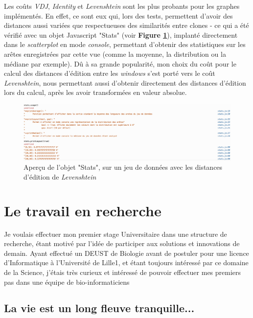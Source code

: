 \documentclass[pdftex,12pt,a4paper]{report}
\begin{document}
\begin{spacing}{1.2}
Les coûts \textit{VDJ}, \textit{Identity} et \textit{Levenshtein} sont les plus probants pour les graphes implémentés. En effet, ce sont eux qui, lors des tests, permettent d'avoir des distances aussi variées que respectueuses des similarités entre clones - ce qui a été vérifié avec un objet Javascript "Stats" (voir \textbf{Figure \ref{fig:stats}}), implanté directement dans le \textit{scatterplot} en mode \textit{console}, permettant d'obtenir des statistiques sur les arêtes enregistrées par cette vue (comme la moyenne, la distribution ou la médiane par exemple).
\newline
Dû à sa grande popularité, mon choix du coût pour le calcul des distances d'édition entre les \textit{windows} s'est porté vers le coût \textit{Levenshtein}, nous permettant aussi d'obtenir directement des distances d'édition lors du calcul, après les avoir transformées en valeur absolue.

\begin{figure}[H]
\begin{center}
	\includegraphics[scale=0.6]{img/Stats.jpg}
\end{center}
\caption{Aperçu de l'objet "Stats", sur un jeu de données avec les distances d'édition de \textit{Levenshtein}}
\label{fig:stats}
\end{figure}

\chapter{Le travail en recherche}

Je voulais effectuer mon premier stage Universitaire dans une structure de recherche, étant motivé par l'idée de participer aux solutions et innovations de demain. Ayant effectué un DEUST de Biologie avant de postuler pour une licence d'Informatique à l'Université de Lille1, et étant toujours intéressé par ce domaine de la Science, j'étais très curieux et intéressé de pouvoir effectuer mes premiers pas dans une équipe de bio-informaticiens

\section{La vie est un long fleuve tranquille...}


\end{spacing}
\end{document}

